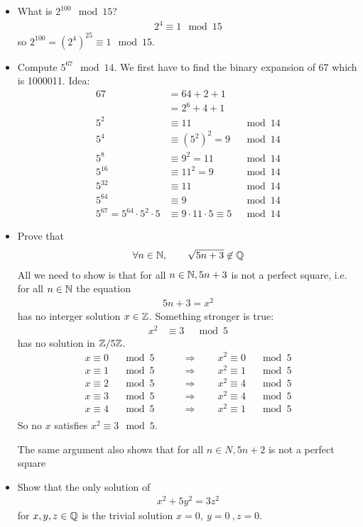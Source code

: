 \begin{ex}
	\begin{itemize}
		\item
		What is $2^{100} \mod 15$?
		\begin{align*}
		2^4 \equiv 1 \mod 15 
		\end{align*}
		so $2^{100} = (2^4)^{25} \equiv 1 \mod 15$.
		\item
		Compute $5^{67} \mod 14$. We first have to find the binary expansion of 67 which is 1000011. Idea:
		\begin{align*}
		67 & = 64 +2+1 & \\
		& = 2^6 + 4+1 \\
		5^2 & \equiv 11 & \mod 14\\
		5^4 & \equiv (5^2)^2 = 9 & \mod 14\\
		5^8 & \equiv 9^2 = 11 & \mod 14 \\
		5^{16} & \equiv 11^2 = 9 & \mod 14 \\
		5^{32} & \equiv 11 & \mod 14 \\
		5^{64} & \equiv 9 & \mod 14 \\
		5^{67} = 5^{64} \cdot 5^2 \cdot 5 & \equiv 9 \cdot 11 \cdot 5 \equiv 5 & \mod 14
		\end{align*}
		
		\item
		Prove that
		\begin{align*}
		\forall n \in \mathbb N, \qquad \sqrt{5n+3} \not\in \mathbb Q
		\end{align*}
		All we need to show is that for all $n \in \mathbb N, 5n+3$ is not a perfect square, i.e. for all $n \in \mathbb N$ the equation 
		\begin{align*}
		5n+3 = x^2
		\end{align*}
		has no interger solution $x \in \mathbb Z$. Something stronger is true:
		\begin{align*}
		x^2 & \equiv 3 & \mod 5
		\end{align*}
		has no solution in $\mathbb Z/5\mathbb Z$.
		\begin{align*}
		x \equiv 0 \quad \mod 5 \qquad & \Rightarrow \qquad x^2 \equiv 0 \quad \mod 5 \\
		x \equiv 1 \quad \mod 5 \qquad & \Rightarrow \qquad x^2 \equiv 1 \quad \mod 5 \\
		x \equiv 2 \quad \mod 5 \qquad & \Rightarrow \qquad x^2 \equiv 4 \quad \mod 5 \\
		x \equiv 3 \quad \mod 5 \qquad & \Rightarrow \qquad x^2 \equiv 4 \quad \mod 5 \\
		x \equiv 4 \quad \mod 5 \qquad & \Rightarrow \qquad x^2 \equiv 1 \quad \mod 5 \\
		\end{align*}
		So no $x$ satisfies $x^2 \equiv 3 \mod 5 $.
		\begin{rk}
			The same argument also shows that for all $n \in N, 5n+2$ is not a perfect square
		\end{rk}
		\item
		Show that the only solution of
		\begin{align*}
		x^2 + 5y^2 = 3z^2
		\end{align*}
		for $x,y,z \in \mathbb Q$ is the trivial solution $x=0, ~ y=0~, z=0$.
		

\end{itemize}
\end{ex}
